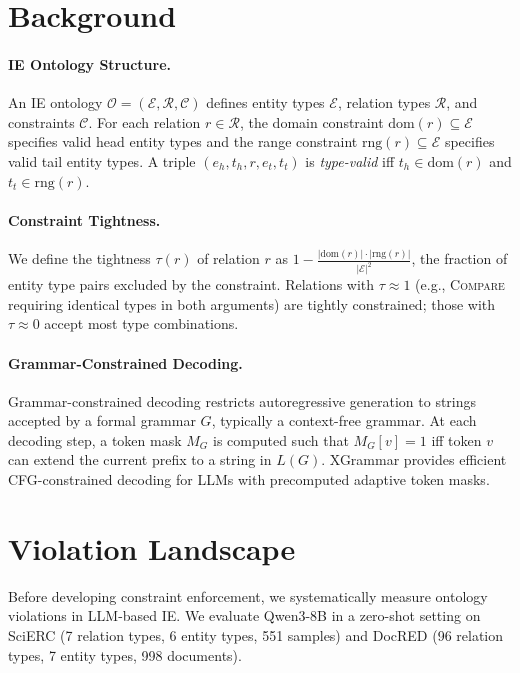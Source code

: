 \documentclass[11pt,a4paper]{article}
\begin{document}
\section{Background}
\label{sec:background}

\paragraph{IE Ontology Structure.}
An IE ontology $\mathcal{O} = (\mathcal{E}, \mathcal{R}, \mathcal{C})$ defines entity types $\mathcal{E}$, relation types $\mathcal{R}$, and constraints $\mathcal{C}$.
For each relation $r \in \mathcal{R}$, the domain constraint $\text{dom}(r) \subseteq \mathcal{E}$ specifies valid head entity types and the range constraint $\text{rng}(r) \subseteq \mathcal{E}$ specifies valid tail entity types.
A triple $(e_h, t_h, r, e_t, t_t)$ is \emph{type-valid} iff $t_h \in \text{dom}(r)$ and $t_t \in \text{rng}(r)$.

\paragraph{Constraint Tightness.}
We define the tightness $\tau(r)$ of relation $r$ as $1 - \frac{|\text{dom}(r)| \cdot |\text{rng}(r)|}{|\mathcal{E}|^2}$, the fraction of entity type pairs excluded by the constraint.
Relations with $\tau \approx 1$ (e.g., \textsc{Compare} requiring identical types in both arguments) are tightly constrained; those with $\tau \approx 0$ accept most type combinations.

\paragraph{Grammar-Constrained Decoding.}
Grammar-constrained decoding restricts autoregressive generation to strings accepted by a formal grammar $G$, typically a context-free grammar.
At each decoding step, a token mask $M_G$ is computed such that $M_G[v] = 1$ iff token $v$ can extend the current prefix to a string in $L(G)$.
XGrammar \cite{Dong2024XGrammar} provides efficient CFG-constrained decoding for LLMs with precomputed adaptive token masks.

\section{Violation Landscape}
\label{sec:landscape}

Before developing constraint enforcement, we systematically measure ontology violations in LLM-based IE.
We evaluate Qwen3-8B in a zero-shot setting on SciERC (7 relation types, 6 entity types, 551 samples) and DocRED (96 relation types, 7 entity types, 998 documents).
\end{document}
